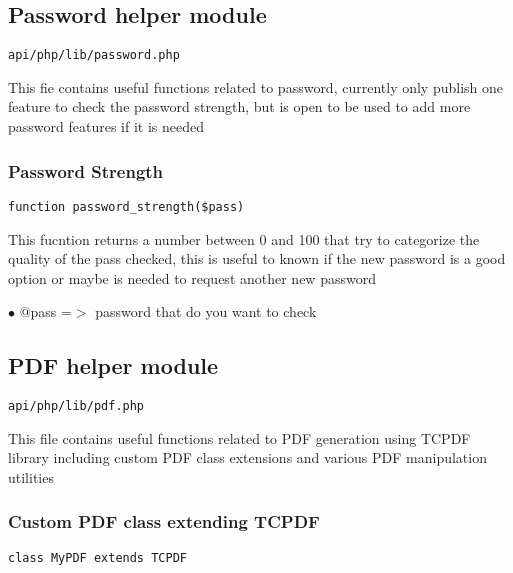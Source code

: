 \documentclass[a4paper]{article}
\begin{document}
\hypertarget{toc499}{}
\subsection{Password helper module}

\begin{lstlisting}
api/php/lib/password.php
\end{lstlisting}

This fie contains useful functions related to password, currently only publish one feature to check
the password strength, but is open to be used to add more password features if it is needed

\hypertarget{toc500}{}
\subsubsection{Password Strength}

\begin{lstlisting}
function password_strength($pass)
\end{lstlisting}

This fucntion returns a number between 0 and 100 that try to categorize
the quality of the pass checked, this is useful to known if the new
password is a good option or maybe is needed to request another new
password

\begin{compactitem}
\item[\color{myblue}$\bullet$] @pass =$>$ password that do you want to check
\end{compactitem}

\hypertarget{toc501}{}
\subsection{PDF helper module}

\begin{lstlisting}
api/php/lib/pdf.php
\end{lstlisting}

This file contains useful functions related to PDF generation using TCPDF library
including custom PDF class extensions and various PDF manipulation utilities

\hypertarget{toc502}{}
\subsubsection{Custom PDF class extending TCPDF}

\begin{lstlisting}
class MyPDF extends TCPDF
\end{lstlisting}
\end{document}
